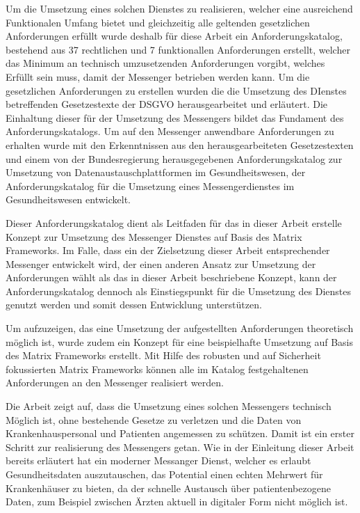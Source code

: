 Um die Umsetzung eines solchen Dienstes zu realisieren, welcher eine ausreichend Funktionalen Umfang bietet und gleichzeitig alle geltenden gesetzlichen Anforderungen erfüllt wurde deshalb für diese Arbeit ein Anforderungskatalog, bestehend aus 37 rechtlichen und 7 funktionallen Anforderungen erstellt, welcher das Minimum an technisch umzusetzenden Anforderungen vorgibt, welches Erfüllt sein muss, damit der Messenger betrieben werden kann. Um die gesetzlichen Anforderungen zu erstellen wurden die die Umsetzung des DIenstes betreffenden Gesetzestexte der DSGVO herausgearbeitet und erläutert. Die Einhaltung dieser für der Umsetzung des Messengers bildet das Fundament des Anforderungskatalogs. Um auf den Messenger anwendbare Anforderungen zu erhalten wurde mit den Erkenntnissen aus den herausgearbeiteten Gesetzestexten und einem von der Bundesregierung herausgegebenen Anforderungskatalog zur Umsetzung von Datenaustauschplattformen im Gesundheitswesen, der Anforderungskatalog für die Umsetzung eines Messengerdienstes im Gesundheitswesen entwickelt.

Dieser Anforderungskatalog dient als Leitfaden für das in dieser Arbeit erstelle Konzept zur Umsetzung des Messenger Dienstes auf Basis des Matrix Frameworks. Im Falle, dass ein der Zielsetzung dieser Arbeit entsprechender Messenger entwickelt wird, der einen anderen Ansatz zur Umsetzung der Anforderungen wählt als das in dieser Arbeit beschriebene Konzept, kann der Anforderungskatalog dennoch als Einstiegspunkt für die Umsetzung des Dienstes genutzt werden und somit dessen Entwicklung unterstützen.

Um aufzuzeigen, das eine Umsetzung der aufgestellten Anforderungen theoretisch möglich ist, wurde zudem ein Konzept für eine beispielhafte Umsetzung auf Basis des Matrix Frameworks erstellt. Mit Hilfe des robusten und auf Sicherheit fokussierten Matrix Frameworks können alle im Katalog festgehaltenen Anforderungen an den Messenger realisiert werden. 

Die Arbeit zeigt auf, dass die Umsetzung eines solchen Messengers technisch Möglich ist, ohne bestehende Gesetze zu verletzen und die Daten von Krankenhauspersonal und Patienten angemessen zu schützen.
Damit ist ein erster Schritt zur realisierung des Messengers getan. Wie in der Einleitung dieser Arbeit bereits erläutert hat ein moderner Messanger Dienst, welcher es erlaubt Gesundheitsdaten auszutauschen, das Potential einen echten Mehrwert für Krankenhäuser zu bieten, da der schnelle Austausch über patientenbezogene Daten, zum Beispiel zwischen Ärzten aktuell in digitaler Form nicht möglich ist. 


